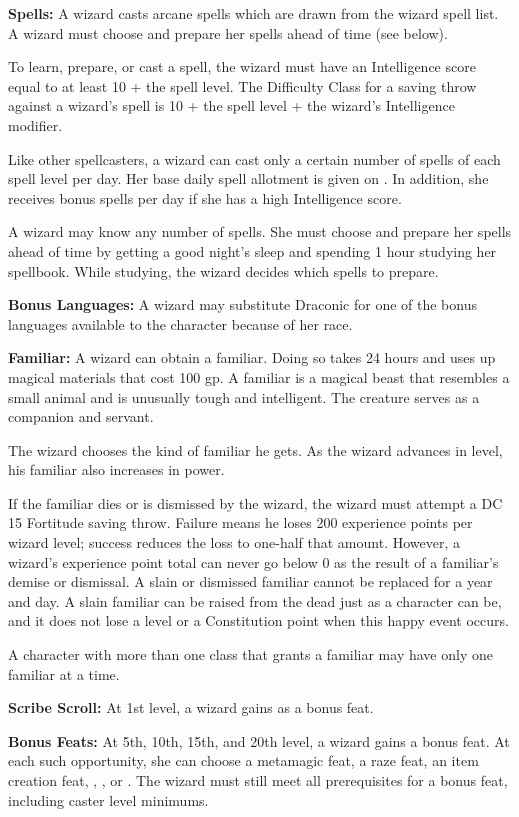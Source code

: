 \textbf{Spells:} A wizard casts arcane spells which are drawn from the wizard spell list. A wizard must choose and prepare her spells ahead of time (see below).

To learn, prepare, or cast a spell, the wizard must have an Intelligence score equal to at least 10 + the spell level. The Difficulty Class for a saving throw against a wizard's spell is 10 + the spell level + the wizard's Intelligence modifier.

Like other spellcasters, a wizard can cast only a certain number of spells of each spell level per day. Her base daily spell allotment is given on . In addition, she receives bonus spells per day if she has a high Intelligence score.

A wizard may know any number of spells. She must choose and prepare her spells ahead of time by getting a good night's sleep and spending 1 hour studying her spellbook. While studying, the wizard decides which spells to prepare.

\textbf{Bonus Languages:} A wizard may substitute Draconic for one of the bonus languages available to the character because of her race.

\textbf{Familiar:} A wizard can obtain a familiar. Doing so takes 24 hours and uses up magical materials that cost 100 gp. A familiar is a magical beast that resembles a small animal and is unusually tough and intelligent. The creature serves as a companion and servant.

The wizard chooses the kind of familiar he gets. As the wizard advances in level, his familiar also increases in power.

If the familiar dies or is dismissed by the wizard, the wizard must attempt a DC 15 Fortitude saving throw. Failure means he loses 200 experience points per wizard level; success reduces the loss to one-half that amount. However, a wizard's experience point total can never go below 0 as the result of a familiar's demise or dismissal. A slain or dismissed familiar cannot be replaced for a year and day. A slain familiar can be raised from the dead just as a character can be, and it does not lose a level or a Constitution point when this happy event occurs.

A character with more than one class that grants a familiar may have only one familiar at a time.

\textbf{Scribe Scroll:} At 1st level, a wizard gains  as a bonus feat.

\textbf{Bonus Feats:} At 5th, 10th, 15th, and 20th level, a wizard gains a bonus feat. At each such opportunity, she can choose a metamagic feat, a raze feat, an item creation feat, , , or . The wizard must still meet all prerequisites for a bonus feat, including caster level minimums.

